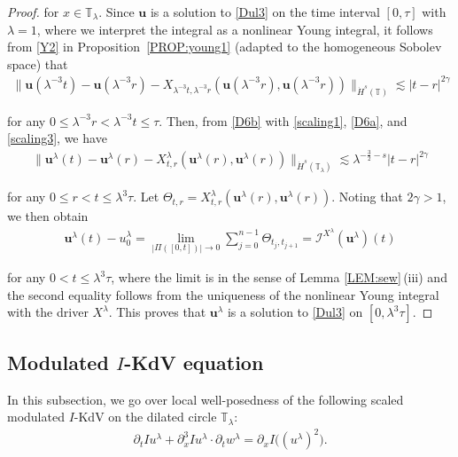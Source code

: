 \documentclass[letterpaper, 11pt,  reqno]{amsart}
\newcommand{\1}{\hspace{0.5mm}\text{I}\hspace{0.5mm}}
\newcommand{\I}{\mathcal{I}}
\newcommand{\noi}{\noindent}
\newcommand{\T}{\mathbb{T}}
\newcommand{\g}{\gamma}
\newcommand{\ld}{\lambda}
\newcommand{\dx}{\partial_x}
\newcommand{\dt}{\partial_t}
\newcommand{\les}{\lesssim}
\newcommand{\uu}{\mathbf{u}}
\newcommand{\Ta}{\Theta}
\numberwithin{equation}{section}
\numberwithin{theorem}{section}
\begin{document}
\begin{proof}
\noi
for $x \in \T_\ld$.
Since $\uu$ is a solution to \eqref{Dul3} 
on the time interval $[0, \tau]$
with $\ld = 1$, 
where we interpret
 the integral as a nonlinear Young integral, 
it follows from \eqref{Y2} in Proposition~\ref{PROP:young1} 
(adapted to the homogeneous Sobolev space) that 
\begin{align}
\| \uu(\ld^{-3}t) - \uu(\ld^{-3}r) 
- X_{\ld^{-3}t, \ld^{-3}r} ( \uu(\ld^{-3}r ) , \uu(\ld^{-3}r))  \|_{\dot H^s(\T)}
\les  |t-r|^{2\g}
\label{D6b}
\end{align}


\noi
for any $0\leq \ld^{-3}r<\ld^{-3}t\leq \tau$.
Then, from \eqref{D6b} with 
\eqref{scaling1}, \eqref{D6a}, and 
\eqref{scaling3}, we have
\begin{align*}
\|\uu^\ld(t) - \uu^\ld(r) - X^\ld_{t,r} (\uu^\ld(r), \uu^\ld (r))\|_{\dot H^s(\T_{\ld})}
\les \ld^{-\frac{3}{2}-s} |t-r|^{2\g}
\end{align*}


\noi
for any $0 \le r < t \le \ld^3 \tau$.
Let  $\Ta_{t, r} = X^\ld_{t,r} (\uu^\ld(r), \uu^\ld (r))$.
Noting that  $2\g > 1$, 
we then obtain 
\begin{align*}
\uu^\ld (t) - u_0^\ld  = \lim_{|\Pi([0,t])|\to 0} 
\sum^{n-1}_{j=0} \Theta_{t_j,t_{j+1}}
= \I^{X^\ld}(\uu^\ld)(t) 
\end{align*} 
 
 \noi
for any $0 < t \le \ld^3 \tau$,   where 
 the limit is in the sense of Lemma \ref{LEM:sew}\,(iii)
 and the second equality follows from the uniqueness
 of the nonlinear Young integral with the driver $X^\ld$.
This proves that 
 $\uu^\ld$ is a solution to \eqref{Dul3}
on $[0, \ld^3\tau]$.
\end{proof}






\subsection{Modulated $I$-KdV equation}
\label{SUBSEC:I2}

In this subsection, we go over  local well-posedness
of the following scaled modulated $I$-KdV
on the dilated circle $\T_\ld$:
\begin{align}
\dt I u^{\ld} +    \dx^3 I u^{\ld}
\cdot \dt  w^{\ld}
  =\partial_x I\big((u^{\ld} )^2\big). 
\label{kdv4}
\end{align}
\end{document}

